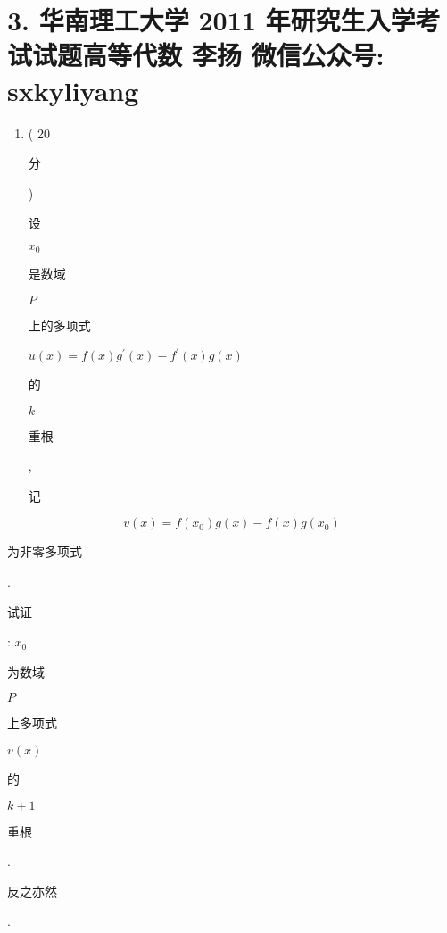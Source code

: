 \documentclass[10pt]{article}
\begin{document}
\section{3. 华南理工大学 2011 年研究生入学考试试题高等代数 
 李扬 
 微信公众号: sxkyliyang}
\begin{enumerate}
  \item ( 20 \begin{CJK}{UTF8}{mj}分\end{CJK}) \begin{CJK}{UTF8}{mj}设\end{CJK} $x_{0}$ \begin{CJK}{UTF8}{mj}是数域\end{CJK} $P$ \begin{CJK}{UTF8}{mj}上的多项式\end{CJK} $u(x)=f(x) g^{\prime}(x)-f^{\prime}(x) g(x)$ \begin{CJK}{UTF8}{mj}的\end{CJK} $k$ \begin{CJK}{UTF8}{mj}重根\end{CJK}, \begin{CJK}{UTF8}{mj}记\end{CJK}
\end{enumerate}
$$
v(x)=f\left(x_{0}\right) g(x)-f(x) g\left(x_{0}\right)
$$
\begin{CJK}{UTF8}{mj}为非零多项式\end{CJK}. \begin{CJK}{UTF8}{mj}试证\end{CJK}: $x_{0}$ \begin{CJK}{UTF8}{mj}为数域\end{CJK} $P$ \begin{CJK}{UTF8}{mj}上多项式\end{CJK} $v(x)$ \begin{CJK}{UTF8}{mj}的\end{CJK} $k+1$ \begin{CJK}{UTF8}{mj}重根\end{CJK}. \begin{CJK}{UTF8}{mj}反之亦然\end{CJK}.
\end{document}
